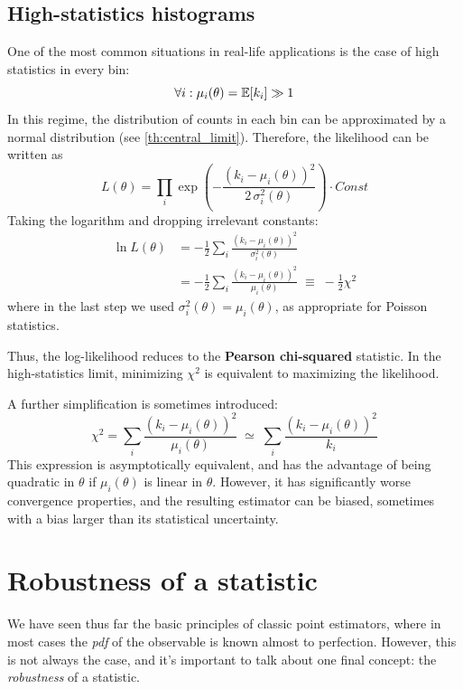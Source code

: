 \subsection{High-statistics histograms}

One of the most common situations in real-life applications is the case of high statistics in every bin:
\[
	\forall i: \mu_i(\theta)=\mathbb{E}[k_i] \gg 1
\]
In this regime, the distribution of counts in each bin can be approximated by a normal distribution (see \ref{th:central_limit}). Therefore, the likelihood can be written as
\[
L(\theta) = \prod_i \exp\left(-\frac{(k_i - \mu_i(\theta))^2}{2\,\sigma_i^2(\theta)}\right) \cdot Const
\]
Taking the logarithm and dropping irrelevant constants:
\begin{align*}
	\ln L(\theta)
	&= -\frac{1}{2}\sum_i \frac{(k_i - \mu_i(\theta))^2}{\sigma_i^2(\theta)} \\
	&= -\frac{1}{2}\sum_i \frac{(k_i - \mu_i(\theta))^2}{\mu_i(\theta)}
	\;\equiv\; -\frac{1}{2}\chi^2
\end{align*}
where in the last step we used $\sigma_i^2(\theta) = \mu_i(\theta)$, as appropriate for Poisson statistics.

Thus, the log-likelihood reduces to the \textbf{Pearson chi-squared} statistic. In the high-statistics limit, minimizing $\chi^2$ is equivalent to maximizing the likelihood.

A further simplification is sometimes introduced:
\begin{equation*}
	\chi^2 = \sum_i \frac{(k_i - \mu_i(\theta))^2}{\mu_i(\theta)}
	\;\simeq\;
	\sum_i \frac{(k_i - \mu_i(\theta))^2}{k_i}
	\tag{Modified $\chi^2$}
	\label{eq:modified_chi2}
\end{equation*}
This expression is asymptotically equivalent, and has the advantage of being quadratic in $\theta$ if $\mu_i(\theta)$ is linear in $\theta$. However, it has significantly worse convergence properties, and the resulting estimator can be biased, sometimes with a bias larger than its statistical uncertainty.

\section{Robustness of a statistic}
We have seen thus far the basic principles of classic point estimators, where in most cases the \emph{pdf} of the observable is known almost to perfection. However, this is not always the case, and it's important to talk about one final concept: the \emph{robustness} of a statistic. 

